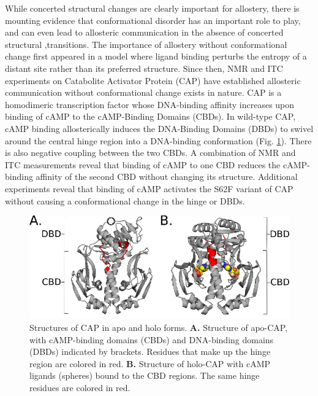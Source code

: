 \documentclass[../main.tex]{subfiles}
\begin{document}
    While concerted structural changes are clearly important for allostery, there is mounting evidence that conformational disorder has an important role to play, and can even lead to allosteric communication in the absence of concerted structural ,transitions\cite{Guo:2016hv,Kern:2003fv,Tzeng:2011by,Hilser:2007je,Burger:2016gy,Haliloglu:2015dj,HenzlerWildman:2007jb,Hilser:2012em}. The importance of allostery without conformational change first appeared in a model where ligand binding perturbs the entropy of a distant site rather than its preferred structure\cite{Cooper:1984tb}. Since then, NMR and ITC experiments on Catabolite Activator Protein (CAP) have established allosteric communication without conformational change exists in nature\cite{Wand:2013dz,Popovych:2006js,Jakob:2014cp}. CAP is a homodimeric transcription factor whose DNA-binding affinity increases upon binding of cAMP to the cAMP-Binding Domains (CBDs)\cite{Harman:2001td,Heyduk:1989wb}. In wild-type CAP, cAMP binding allosterically induces the DNA-Binding Domains (DBDs) to swivel around the central hinge region into a DNA-binding conformation (Fig. \ref{fig:cap-intro-figure})\cite{Schultz:1991uh,Seok:2014cs}. There is also negative coupling between the two CBDs\cite{Harman:2001td,Heyduk:1989wb,Popovych:2009iu}. A combination of NMR and ITC measurements reveal that binding of cAMP to one CBD reduces the cAMP-binding affinity of the second CBD without changing its structure\cite{Popovych:2006js,Popovych:2009iu}. Additional experiments reveal that binding of cAMP activates the S62F variant of CAP without causing a conformational change in the hinge or DBDs\cite{Tzeng:2009im,Tzeng:2012cu}.


    \begin{figure}[!htb] %
        \centering
        \includegraphics[width=4.5in]{cap-intro-fig.eps}
        \caption[Structures of CAP in apo and holo forms.]
            {Structures of CAP in apo and holo forms. \textbf{A.} Structure of apo-CAP, with cAMP-binding domains (CBDs) and DNA-binding domains (DBDs) indicated by brackets. Residues that make up the hinge region are colored in red. \textbf{B.} Structure of holo-CAP with cAMP ligands (spheres) bound to the CBD regions. The same hinge residues are colored in red.}
        \label{fig:cap-intro-figure}
    \end{figure}
\end{document}
